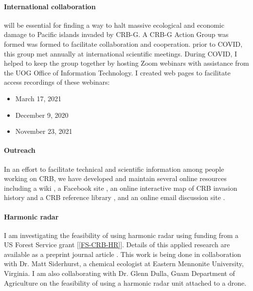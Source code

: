 \begin{refsection}
\paragraph{International collaboration} will be essential for finding a way to halt massive ecological and economic damage to Pacific islands invaded by CRB-G. A CRB-G Action Group was formed was formed to facilitate collaboration and cooperation. prior to COVID, this group met annually at international scientific meetings. During COVID, I helped to keep the group together by hosting Zoom webinars with assistance from the UOG Office of Information Technology. I created web pages to facilitate access recordings of these webinars: 
\begin{itemize}
	\item March 17, 2021 \cite{moore_video_2021-1}
	\item December 9, 2020 \cite{moore_video_2020}
	\item November 23, 2021 \cite{moore_video_2021}	
\end{itemize}

\paragraph{Outreach} In an effort to facilitate technical and scientific information among people working on CRB, we have developed and maintain several online resources including a wiki \parencite{moore_crb-g_2019}, a Facebook site \parencite{moore_facebook_2019}, an online interactive map of CRB invasion history \parencite{moore_online_2019} and a CRB reference library \parencite{moore_online_2021}, and an online email discussion site \parencite{moore_online_2021-1}.

\paragraph{Harmonic radar}
I am investigating the feasibility of using harmonic radar using funding from a US Forest Service grant [\ref{FS-CRB-HR}]. Details of this applied research are available as a preprint journal article \cite{moore_detecting_2022}. This work is being done in collaboration with Dr. Matt Siderhurst, a chemical ecologist at Eastern Mennonite University, Virginia. I am also collaborating with Dr. Glenn Dulla, Guam Department of Agriculture on the feasibility of using a harmonic radar unit attached to a drone. 			
		

\end{refsection}
